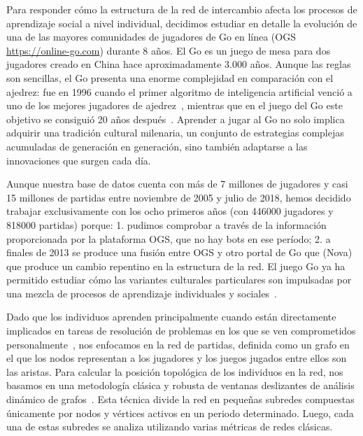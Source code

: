 \documentclass[a4paper,11pt]{book}
\theoremstyle{definition}
\begin{document}
Para responder c\'omo la estructura de la red de intercambio afecta los procesos de aprendizaje social a nivel individual, decidimos estudiar en detalle la evoluci\'on de una de las mayores comunidades de jugadores de Go en l\'inea (OGS \url{https://online-go.com}) durante 8 a\~nos.
%
El Go es un juego de mesa para dos jugadores creado en China hace aproximadamente 3.000 a\~nos.
%
Aunque las reglas son sencillas, el Go presenta una enorme complejidad en comparaci\'on con el ajedrez: fue en 1996 cuando el primer algoritmo de inteligencia artificial venci\'o a uno de los mejores jugadores de ajedrez~\cite{Campbell2002}, mientras que en el juego del Go este objetivo se consigui\'o 20 a\~nos despu\'es~\cite{Silver2016}.
%
Aprender a jugar al Go no solo implica adquirir una tradici\'on cultural milenaria, un conjunto de estrategias complejas acumuladas de generaci\'on en generaci\'on, sino tambi\'en adaptarse a las innovaciones que surgen cada d\'ia.


Aunque nuestra base de datos cuenta con m\'as de 7 millones de jugadores y casi 15 millones de partidas entre noviembre de 2005 y julio de 2018, hemos decidido trabajar exclusivamente con los ocho primeros a\~nos (con \num{446000} jugadores y \num{818000} partidas) porque: 1. pudimos comprobar a trav\'es de la informaci\'on proporcionada por la plataforma OGS, que no hay bots en ese per\'iodo; 2. a finales de 2013 se produce una fusi\'on entre OGS y otro portal de Go que (Nova) que produce un cambio repentino en la estructura de la red.
%
El juego Go ya ha permitido estudiar c\'omo las variantes culturales particulares son impulsadas por una mezcla de procesos de aprendizaje individuales y sociales~\cite{Beheim2014}.


Dado que los individuos aprenden principalmente cuando est\'an directamente implicados en tareas de resoluci\'on de problemas en los que se ven comprometidos personalmente~\cite{Ormrod2017}, nos enfocamos en la red de partidas, definida como un grafo en el que los nodos representan a los jugadores y los juegos jugados entre ellos son las aristas.
%
Para calcular la posici\'on topol\'ogica de los individuos en la red, nos basamos en una metodolog\'ia cl\'asica y robusta de ventanas deslizantes de an\'alisis din\'amico de grafos~\cite{Kossinets2006, Mcgregor2014}.
%
Esta t\'ecnica divide la red en peque\~nas subredes compuestas \'unicamente por nodos y v\'ertices activos en un periodo determinado.
%
Luego, cada una de estas subredes se analiza utilizando varias m\'etricas de redes cl\'asicas.
\end{document}
